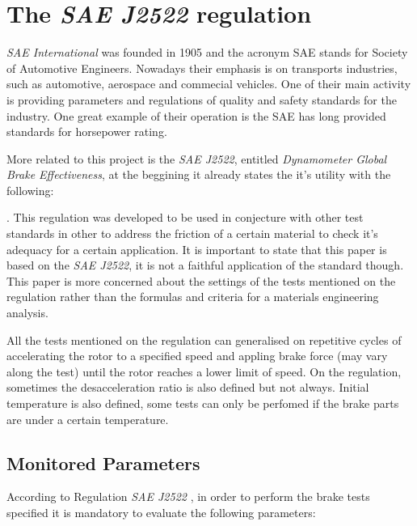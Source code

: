\section{The \textit{SAE J2522} regulation}\label{the-sae-j2522-regulation}

		\textit{SAE International} was founded in 1905 and the acronym SAE stands for Society of Automotive Engineers. Nowadays their emphasis is on transports industries, such as automotive, aerospace and commecial vehicles. One of their main activity is providing parameters and regulations of quality and safety standards for the industry. One great example of their operation is the SAE has long provided standards for horsepower rating.
		\par
		More related to this project is the \textit{SAE J2522}, entitled \textit{Dynamometer Global Brake Effectiveness}, at the beggining it already states the it's utility with the following:


		\cite{saej2522}. This regulation was developed to be used in conjecture with other test standards in other to address the friction of a certain material to check it's adequacy for a certain application. It is important to state that this paper is based on the \textit{SAE J2522}, it is not a faithful application of the standard though. This paper is more concerned about the settings of the tests mentioned on the regulation rather than the formulas and criteria for a materials engineering analysis.
		\par
		All the tests mentioned on the regulation can generalised on repetitive cycles of accelerating the rotor to a specified speed and appling brake force (may vary along the test) until the rotor reaches a lower limit of speed. On the regulation, sometimes the desacceleration ratio is also defined but not always. Initial temperature is also defined, some tests can only be perfomed if the brake parts are under a certain temperature.

		\subsection{Monitored Parameters}\label{ssec:monitored-parameters}
			According to Regulation \textit{SAE J2522} \cite{saej2522}, in order to perform the brake tests specified it is mandatory to evaluate the following parameters:

